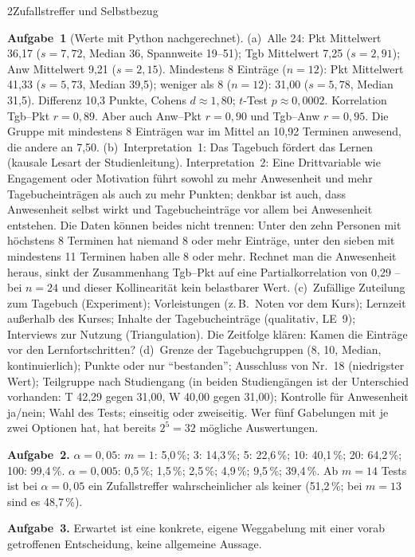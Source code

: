 \begin{uebungsblattb}{2}{Zufallstreffer und Selbstbezug}
\begin{lehrhinweis}[Erwartungshorizont]
\textbf{Aufgabe~1} (Werte mit Python nachgerechnet).
(a)~Alle 24: Pkt Mittelwert 36,17 ($s=7{,}72$, Median 36, Spannweite
19--51); Tgb Mittelwert 7,25 ($s=2{,}91$); Anw Mittelwert 9,21
($s=2{,}15$). Mindestens 8 Einträge ($n=12$): Pkt Mittelwert 41,33
($s=5{,}73$, Median 39,5); weniger als 8 ($n=12$): 31,00 ($s=5{,}78$,
Median 31,5). Differenz 10,3 Punkte, Cohens $d\approx1{,}80$;
$t$-Test $p\approx0{,}0002$. Korrelation Tgb--Pkt $r=0{,}89$. Aber auch
Anw--Pkt $r=0{,}90$ und Tgb--Anw $r=0{,}95$. Die Gruppe mit mindestens 8
Einträgen war im Mittel an 10,92 Terminen anwesend, die andere an 7,50.
(b)~Interpretation~1: Das Tagebuch fördert das Lernen (kausale Lesart der
Studienleitung). Interpretation~2: Eine Drittvariable wie Engagement oder
Motivation führt sowohl zu mehr Anwesenheit und mehr Tagebucheinträgen
als auch zu mehr Punkten; denkbar ist auch, dass Anwesenheit selbst
wirkt und Tagebucheinträge vor allem bei Anwesenheit entstehen. Die Daten
können beides nicht trennen: Unter den zehn Personen mit höchstens 8
Terminen hat niemand 8 oder mehr Einträge, unter den sieben mit
mindestens 11 Terminen haben alle 8 oder mehr. Rechnet man die Anwesenheit
heraus, sinkt der Zusammenhang Tgb--Pkt auf eine Partialkorrelation von
0,29 -- bei $n=24$ und dieser Kollinearität kein belastbarer Wert.
(c)~Zufällige Zuteilung zum Tagebuch (Experiment); Vorleistungen (z.\,B.\
Noten vor dem Kurs); Lernzeit außerhalb des Kurses; Inhalte der
Tagebucheinträge (qualitativ, LE~9); Interviews zur Nutzung
(Triangulation). Die Zeitfolge klären: Kamen die Einträge vor den
Lernfortschritten?
(d)~Grenze der Tagebuchgruppen (8, 10, Median, kontinuierlich); Punkte
oder nur \enquote{bestanden}; Ausschluss von Nr.~18 (niedrigster Wert);
Teilgruppe nach Studiengang (in beiden Studiengängen ist der Unterschied
vorhanden: T 42,29 gegen 31,00, W 40,00 gegen 31,00); Kontrolle für
Anwesenheit ja/nein; Wahl des Tests; einseitig oder zweiseitig. Wer fünf
Gabelungen mit je zwei Optionen hat, hat bereits $2^5=32$ mögliche
Auswertungen.

\textbf{Aufgabe~2.} $\alpha=0{,}05$: $m=1$: 5,0\,\%; 3: 14,3\,\%; 5:
22,6\,\%; 10: 40,1\,\%; 20: 64,2\,\%; 100: 99,4\,\%.
$\alpha=0{,}005$: 0,5\,\%; 1,5\,\%; 2,5\,\%; 4,9\,\%; 9,5\,\%; 39,4\,\%.
Ab $m=14$ Tests ist bei $\alpha=0{,}05$ ein Zufallstreffer
wahrscheinlicher als keiner (51,2\,\%; bei $m=13$ sind es 48,7\,\%).

\textbf{Aufgabe~3.} Erwartet ist eine konkrete, eigene Weggabelung mit
einer vorab getroffenen Entscheidung, keine allgemeine Aussage.
\end{lehrhinweis}
\end{uebungsblattb}
